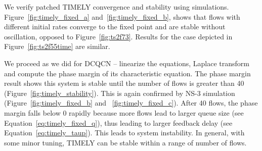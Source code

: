 We verify patched TIMELY convergence and stability using simulations.
Figure~\ref{fig:timely_fixed_a} and~\ref{fig:timely_fixed_b}, shows that flows
with different initial rates converge to the fixed point and are stable without
oscillation, opposed to Figure~\ref{fig:ts2f73}. Results for the case depicted
in Figure~\ref{fig:ts2f55time} are similar.

 We proceed as we did for DCQCN -- linearize the equations,
Laplace transform and compute the phase margin of its characteristic equation.
The phase margin result shows this system is stable until the number of flows is
greater than 40 (Figure~\ref{fig:timely_stability}).  This is again confirmed by
NS-3 simulation (Figure~\ref{fig:timely_fixed_b} and ~\ref{fig:timely_fixed_c}).
After 40 flows, the phase margin falls below 0 rapidly because more flows lead
to larger queue size (see Equation~\ref{eq:timely_fixed_q}), thus leading to
larger feedback delay (see Equation~\ref{eq:timely_taup}).  This leads to system
instability. In general, with some minor tuning, TIMELY can be stable within a
range of number of flows.
